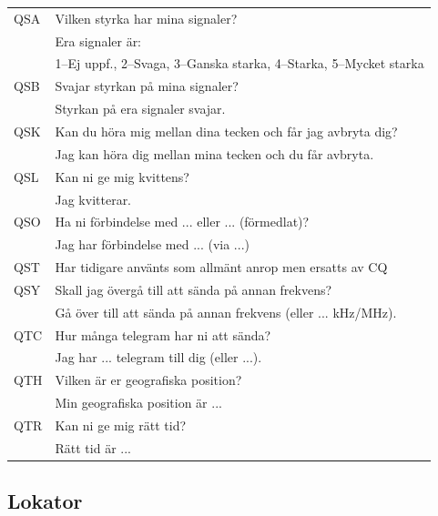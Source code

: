 \begin{longtable}{ll}
	QSA & Vilken styrka har mina signaler?                                     \\
	    & Era signaler är:                                                     \\
	    & 1--Ej uppf., 2--Svaga, 3--Ganska starka, 4--Starka, 5--Mycket starka \\ \hline
	QSB & Svajar styrkan på mina signaler?                                     \\
	    & Styrkan på era signaler svajar.                                      \\ \hline
	QSK & Kan du höra mig mellan dina tecken och får jag avbryta dig?          \\
	    & Jag kan höra dig mellan mina tecken och du får avbryta.              \\ \hline
	QSL & Kan ni ge mig kvittens?                                              \\
	    & Jag kvitterar.                                                       \\ \hline
	QSO & Ha ni förbindelse med ... eller ... (förmedlat)?                     \\
	    & Jag har förbindelse med ... (via ...)                                \\ \hline
	QST & Har tidigare använts som allmänt anrop men ersatts av CQ             \\ \hline
	QSY & Skall jag övergå till att sända på annan frekvens?                   \\
	    & Gå över till att sända på annan frekvens (eller ... kHz/MHz).        \\ \hline
	QTC & Hur många telegram har ni att sända?                                 \\
	    & Jag har ... telegram till dig (eller ...).                           \\ \hline
	QTH & Vilken är er geografiska position?                                   \\
	    & Min geografiska position är ...                                      \\ \hline
	QTR & Kan ni ge mig rätt tid?                                              \\
	    & Rätt tid är ...                                                      \\ 
\end{longtable}

\subsection{Lokator}

